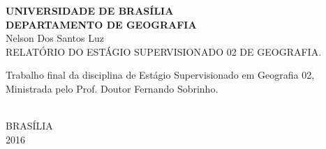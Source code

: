 \begin{titlepage}
    \begin{center}
        {\large \textbf{UNIVERSIDADE DE BRASÍLIA}} \\
        {\large \textbf{DEPARTAMENTO DE GEOGRAFIA}} \\[3.3cm]
        {\large Nelson Dos Santos Luz} \\[3.3cm]
        {\Huge RELATÓRIO DO ESTÁGIO SUPERVISIONADO 02 DE GEOGRAFIA.} \\[3.6cm]
        \hspace{.45\textwidth} %
        \begin{minipage}{.5\textwidth}
                Trabalho final da disciplina de Estágio Supervisionado em Geografia 02, Ministrada pelo Prof. Doutor Fernando Sobrinho.
        \end{minipage}\\[3.3cm]
        \vfill
        {\large BRASÍLIA} \\
        {\large 2016}
    \end{center}
\end{titlepage}